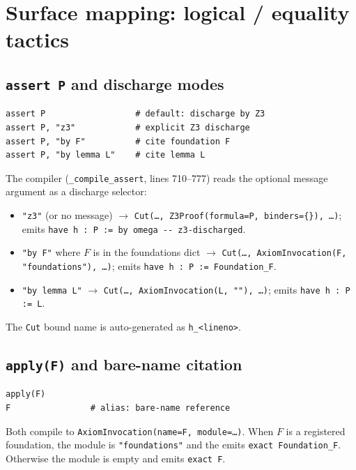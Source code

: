 \section{Surface mapping: logical / equality tactics}
\label{sec:psdl-logical}

\subsection{\texttt{assert P} and discharge modes}

\begin{lstlisting}[language=psdl]
assert P                  # default: discharge by Z3
assert P, "z3"            # explicit Z3 discharge
assert P, "by F"          # cite foundation F
assert P, "by lemma L"    # cite lemma L
\end{lstlisting}

The compiler (\texttt{\_compile\_assert}, lines 710--777) reads the
optional message argument as a discharge selector:
\begin{itemize}[leftmargin=1.7em]
  \item \texttt{"z3"} (or no message) $\to$ \texttt{Cut(\dots,
    Z3Proof(formula=P, binders=\{\}), \dots)}; \Lean{} emits
    \verb|have h : P := by omega -- z3-discharged|.
  \item \texttt{"by F"} where $F$ is in the foundations dict $\to$
    \texttt{Cut(\dots, AxiomInvocation(F, "foundations"), \dots)};
    \Lean{} emits \verb|have h : P := Foundation_F|.
  \item \texttt{"by lemma L"} $\to$ \texttt{Cut(\dots,
    AxiomInvocation(L, ""), \dots)}; \Lean{} emits
    \verb|have h : P := L|.
\end{itemize}

The \texttt{Cut} bound name is auto-generated as \texttt{h\_<lineno>}.

\subsection{\texttt{apply(F)} and bare-name citation}

\begin{lstlisting}[language=psdl]
apply(F)
F                # alias: bare-name reference
\end{lstlisting}

Both compile to \texttt{AxiomInvocation(name=F, module=\dots)}.  When
$F$ is a registered foundation, the module is \texttt{"foundations"}
and the \Lean{} emits \verb|exact Foundation_F|.  Otherwise the
module is empty and \Lean{} emits \verb|exact F|.

